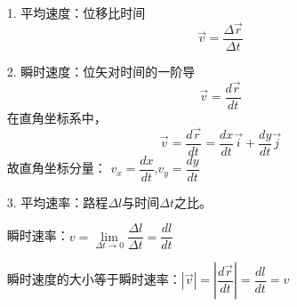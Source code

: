 \begin{itemize}
    \item [1.]平均速度：位移比时间$$\vec{v}=\dfrac{\Delta \vec{r}}{\Delta t}$$
    \item [2.]瞬时速度：位矢对时间的一阶导
    $$\vec{v} = \dfrac{d\vec{r}}{dt}$$
    在直角坐标系中，
    $$\vec{v} = \dfrac{d\vec{r}}{dt} = \dfrac{dx}{dt}\vec{i}+\dfrac{dy}{dt}\vec{j}$$
    故直角坐标分量：
    $v_x = \dfrac{dx}{dt}$,\quad$v_y = \dfrac{dy}{dt}$
    \item [3.]平均速率：路程$\Delta l$与时间$\Delta t$之比。
    
    
    瞬时速率：$v={\lim\limits_{\Delta t \to 0}} \dfrac{\Delta l}{\Delta t}=\dfrac{dl}{dt}$


    瞬时速度的大小等于瞬时速率：$|\vec{v}|=|\dfrac{d\vec{r}}{dt}|
    =\dfrac{dl}{dt}=v$
\end{itemize}